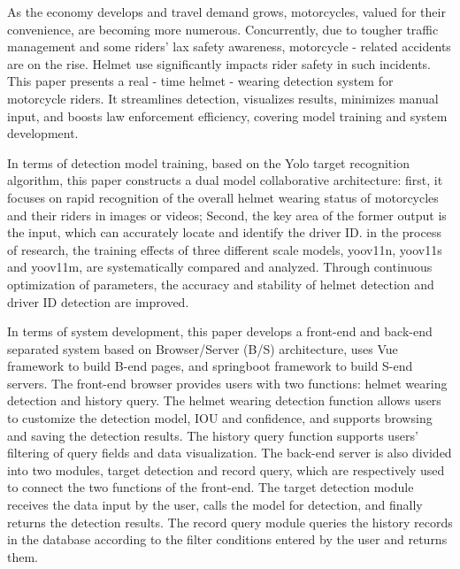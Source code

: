 As the economy develops and travel demand grows, motorcycles, valued for their convenience, are becoming more numerous. Concurrently, due to tougher traffic management and some riders' lax safety awareness, motorcycle - related accidents are on the rise. Helmet use significantly impacts rider safety in such incidents. This paper presents a real - time helmet - wearing detection system for motorcycle riders. It streamlines detection, visualizes results, minimizes manual input, and boosts law enforcement efficiency, covering model training and system development.

In terms of detection model training, based on the Yolo target recognition algorithm, this paper constructs a dual model collaborative architecture: first, it focuses on rapid recognition of the overall helmet wearing status of motorcycles and their riders in images or videos; Second, the key area of the former output is the input, which can accurately locate and identify the driver ID. in the process of research, the training effects of three different scale models, yoov11n, yoov11s and yoov11m, are systematically compared and analyzed. Through continuous optimization of parameters, the accuracy and stability of helmet detection and driver ID detection are improved.

In terms of system development, this paper develops a front-end and back-end separated system based on Browser/Server (B/S) architecture, uses Vue framework to build B-end pages, and springboot framework to build S-end servers. The front-end browser provides users with two functions: helmet wearing detection and history query. The helmet wearing detection function allows users to customize the detection model, IOU and confidence, and supports browsing and saving the detection results. The history query function supports users' filtering of query fields and data visualization. The back-end server is also divided into two modules, target detection and record query, which are respectively used to connect the two functions of the front-end. The target detection module receives the data input by the user, calls the model for detection, and finally returns the detection results. The record query module queries the history records in the database according to the filter conditions entered by the user and returns them.